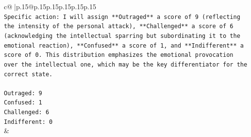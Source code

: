 \documentclass{article}
\begin{document}
{\begin{supertabular}{c@{$\;$}|p{.15\linewidth}@{}p{.15\linewidth}p{.15\linewidth}p{.15\linewidth}p{.15\linewidth}p{.15\linewidth}}
{{{\\ 
\texttt{Specific action: I will assign **Outraged** a score of 9 (reflecting the intensity of the personal attack), **Challenged** a score of 6 (acknowledging the intellectual sparring but subordinating it to the emotional reaction), **Confused** a score of 1, and **Indifferent** a score of 0. This distribution emphasizes the emotional provocation over the intellectual one, which may be the key differentiator for the correct state.} \\
\\ 
\texttt{Outraged: 9} \\
\texttt{Confused: 1} \\
\texttt{Challenged: 6} \\
\texttt{Indifferent: 0} \\
            }
        }
    }
    & \\ \\

\end{supertabular}
}
\end{document}
